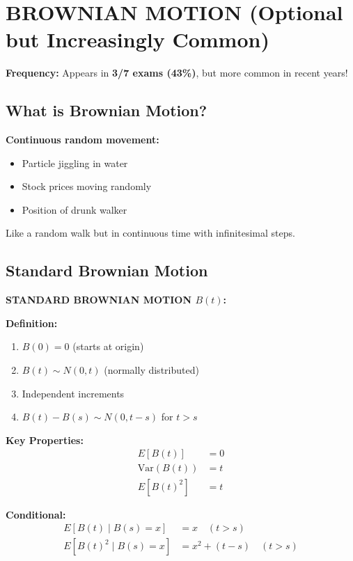 \documentclass[10pt,letterpaper]{article}
\begin{document}
\newpage

\section{BROWNIAN MOTION (Optional but Increasingly Common)}

\begin{criticalbox}
\textbf{Frequency:} Appears in \textbf{3/7 exams (43\%)}, but more common in recent years!
\end{criticalbox}

\subsection{What is Brownian Motion?}

\textbf{Continuous random movement:}
\begin{itemize}
  \item Particle jiggling in water
  \item Stock prices moving randomly
  \item Position of drunk walker
\end{itemize}

Like a random walk but in continuous time with infinitesimal steps.

\subsection{Standard Brownian Motion}

\begin{formulabox}
\textbf{STANDARD BROWNIAN MOTION $B(t)$:}

\vspace{0.2cm}

\textbf{Definition:}
\begin{enumerate}
  \item $B(0) = 0$ (starts at origin)
  \item $B(t) \sim N(0, t)$ (normally distributed)
  \item Independent increments
  \item $B(t) - B(s) \sim N(0, t-s)$ for $t > s$
\end{enumerate}

\textbf{Key Properties:}
\begin{align*}
E[B(t)] &= 0 \\
\text{Var}(B(t)) &= t \\
E[B(t)^2] &= t
\end{align*}

\textbf{Conditional:}
\begin{align*}
E[B(t) \mid B(s) = x] &= x \quad (t > s) \\
E[B(t)^2 \mid B(s) = x] &= x^2 + (t-s) \quad (t > s)
\end{align*}
\end{formulabox}
\end{document}
